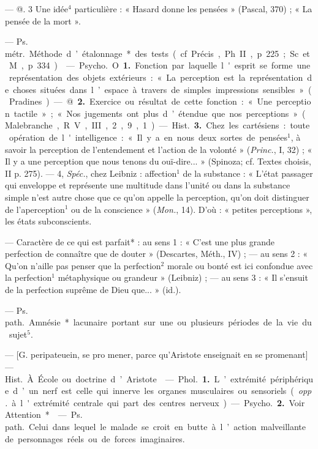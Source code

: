 \begin{itemize}[leftmargin=1cm, label=, itemsep=1pt]
— @. 3 Une idée$^4$ particulière :
« Hasard donne les pensées » (Pascal,
370) ; « La pensée de la mort ».

 — \si{Ps. métr.} Méthode
d’étalonnage* des tests (cf. Précis,
Ph. II, p. 225; Sc. et M., p. 334).

 — \si{Psycho.} O. {\bf 1.} Fonction
par laquelle l'esprit se forme une
représentation des objets extérieurs :
« La perception est la représentation de choses situées dans l’espace à
travers de simples impressions sensibles » (Pradines). — @. {\bf 2.} Exercice
ou résultat de cette fonction : « Une
perception tactile »; « Nos jugements
ont plus d’étendue que nos perceptions » (Malebranche, R. V., III,
2, 9, 1).

— \si{Hist.} {\bf 3.} Chez les cartésiens :
toute opération de l'intelligence :
« Il y a en nous deux sortes de pensées$^1$, à savoir la perception de l’entendement et l’action de la volonté »
({\it Princ.}, I, 32) ; « Il y a une perception que nous tenons du ouï-dire... »
(Spinoza; cf. Textes choisis, II
p. 275). — 4, {\it Spéc.}, chez Leibniz :
affection$^1$ de la substance : « L'état
passager qui enveloppe et représente une multitude dans l’unité ou
dans la substance simple n’est autre
chose que ce qu’on appelle la perception, qu’on doit distinguer de
l’aperception$^1$ ou de la conscience »
({\it Mon.}, 14). D'où : « petites perceptions », les états subconscients.

 — Caractère de ce qui est
parfait* : au sens 1 : « C’est une plus
grande perfection de connaître que
de douter » (Descartes, Méth., IV) ;
— au sens 2 : « Qu'on n'aille pas
penser que la perfection$^2$ morale ou
bonté est ici confondue avec la perfection$^1$ métaphysique ou grandeur »
(Leibniz) ; — au sens 3 : « Il s'ensuit
de la perfection suprême de Dieu
que... » (id.).

 — \si{Ps. path.}
Amnésie* lacunaire portant sur une
ou plusieurs périodes de la vie du
sujet$^5$.

 — [G. peripateuein, se pro
mener, parce qu’Aristote enseignait
en se promenant] — \si{Hist.} À. École
ou doctrine d’Aristote.

 — \si{Phol.} {\bf 1.} L’extrémité
périphérique d’un nerf est celle qui
innerve les organes musculaires ou
sensoriels ({\it opp.} à l'extrémité centrale
qui part des centres nerveux). —
\si{Psycho.} {\bf 2.} Voir Attention*.

 — \si{Ps. path.}
Celui dans lequel le malade se croit
en butte à l’action malveillante de
personnages réels ou de forces imaginaires.


\end{itemize}
